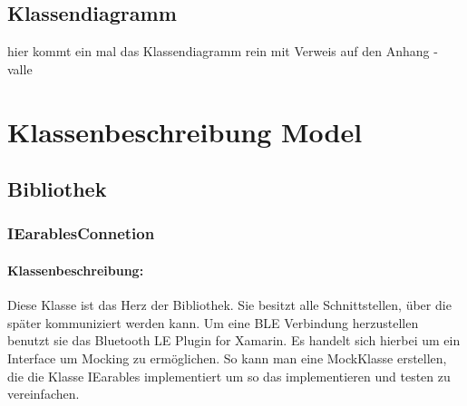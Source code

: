 \documentclass[a4paper,12pt]{article}
\begin{document}
  \subsection{Klassendiagramm}
hier kommt ein mal das Klassendiagramm rein mit Verweis auf den Anhang - valle
\clearpage
\section{Klassenbeschreibung Model}
\subsection{Bibliothek}
\subsubsection{IEarablesConnetion}

\paragraph{Klassenbeschreibung:}
Diese Klasse ist das Herz der Bibliothek. Sie besitzt alle Schnittstellen, über die später kommuniziert werden kann. Um eine BLE Verbindung herzustellen benutzt sie das Bluetooth LE Plugin for Xamarin. Es handelt sich hierbei um ein Interface um Mocking zu ermöglichen. So kann man eine MockKlasse erstellen, die die Klasse IEarables implementiert um so das implementieren und testen zu vereinfachen.
\end{document}
